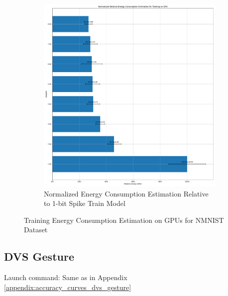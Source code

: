 \begin{figure}[H]
\begin{subfigure}[H]{0.48\textwidth}
                \includegraphics[width=\textwidth]{../standard/NMNIST/plots/nmnist_train_relative_energy_gpu.pdf}
                \caption{Normalized Energy Consumption Estimation Relative to 1-bit Spike Train Model}
            \end{subfigure}
            \caption{Training Energy Consumption Estimation on GPUs for NMNIST Dataset}
        \end{figure}

    \subsection{DVS Gesture}
    \label{appendix:energy_gpu_dvs_gesture}
        Launch command: Same as in Appendix \ref{appendix:accuracy_curves_dvs_gesture}

